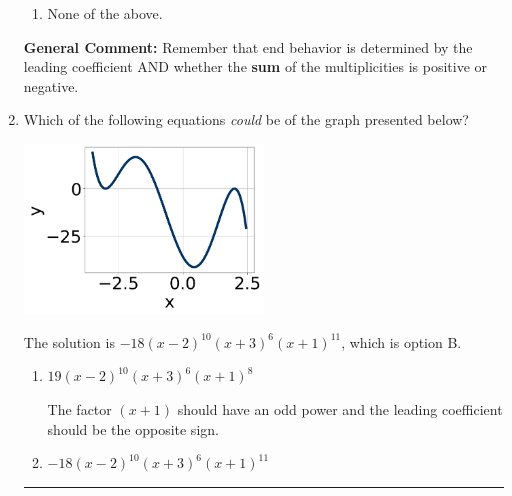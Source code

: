 \documentclass{extbook}[14pt]
\newcommand{\litem}[1]{\item #1

\rule{\textwidth}{0.4pt}}
\begin{document}
\begin{enumerate}
{\begin{enumerate}[label=\Alph*.]
\item None of the above.\end{enumerate}
\textbf{General Comment:} Remember that end behavior is determined by the leading coefficient AND whether the \textbf{sum} of the multiplicities is positive or negative.
}
\litem{
Which of the following equations \textit{could} be of the graph presented below?

\begin{center}
    \includegraphics[width=0.5\textwidth]{../Figures/polyGraphToFunctionC.png}
\end{center}


The solution is \( -18(x - 2)^{10} (x + 3)^{6} (x + 1)^{11} \), which is option B.\begin{enumerate}[label=\Alph*.]
\item \( 19(x - 2)^{10} (x + 3)^{6} (x + 1)^{8} \)

The factor $(x + 1)$ should have an odd power and the leading coefficient should be the opposite sign.
\item \( -18(x - 2)^{10} (x + 3)^{6} (x + 1)^{11} \)


\end{enumerate}}
\end{enumerate}
\end{document}
